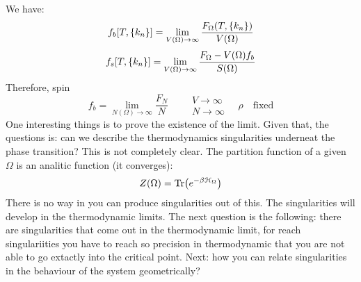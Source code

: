\documentclass[../main/main.tex]{subfiles}
\begin{document}
We have:
\begin{equation}
  f_b [T,\qty{k_n} ] = \lim_{V(\Omega )\rightarrow \infty } \frac{F_\Omega (T, \qty{k_n} )}{V(\Omega )}
  \label{eq:}
\end{equation}
\begin{equation}
  f_s [T,\qty{k_n} ] = \lim_{V(\Omega )\rightarrow \infty } \frac{F_\Omega - V (\Omega ) f_b}{S(\Omega )}
  \label{eq:}
\end{equation}
Therefore, spin
\begin{equation}
  f_b = \lim_{N(\Omega)\rightarrow \infty } \frac{F_N}{N} \qquad \substack{V \rightarrow \infty  \\ N \rightarrow \infty } \quad \rho \quad \text{fixed}
  \label{eq:}
\end{equation}
One interesting things is to prove the existence of the limit. Given that, the questions is: can we describe the thermodynamics singularities underneat the phase transition? This is not completely clear. The partition function of a given \( \Omega  \) is an analitic function (it converges):
\begin{equation}
  Z (\Omega ) = \Tr(e^{-\beta \mathcal{H}_\Omega} )
  \label{eq:}
\end{equation}
There is no way in you can produce singularities out of this. The singularities will develop in the thermodynamic limits.
The next question is the following: there are singularities that come out in the thermodynamic limit, for reach singulariities you have to reach so precision in thermodynamic that you are not able to go extactly into the critical point. Next: how you can relate singularities in the behaviour of the system geometrically?
\end{document}
